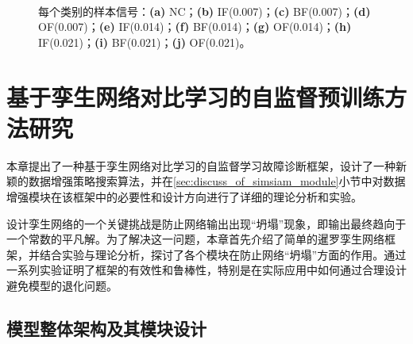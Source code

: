 \documentclass[master]{thesis-uestc}
\begin{document}
\begin{figure}
    \centering
    \\ %
    \\ %
    \\ %

    \caption{每个类别的样本信号：\textbf{(a)} NC；\textbf{(b)} IF(0.007)；\textbf{(c)} BF(0.007)；\textbf{(d)} OF(0.007)；\textbf{(e)} IF(0.014)；\textbf{(f)} BF(0.014)；\textbf{(g)} OF(0.014)；\textbf{(h)} IF(0.021)；\textbf{(i)} BF(0.021)；\textbf{(j)} OF(0.021)。}
    \label{cwru_samples}
\end{figure}



\chapter{基于孪生网络对比学习的自监督预训练方法研究}
本章提出了一种基于孪生网络对比学习的自监督学习故障诊断框架，设计了一种新颖的数据增强策略搜索算法，并在\ref{sec:discuss_of_simsiam_module}小节中对数据增强模块在该框架中的必要性和设计方向进行了详细的理论分析和实验。

设计孪生网络的一个关键挑战是防止网络输出出现“坍塌”现象，即输出最终趋向于一个常数的平凡解。为了解决这一问题，本章首先介绍了简单的暹罗孪生网络框架，并结合实验与理论分析，探讨了各个模块在防止网络“坍塌”方面的作用。通过一系列实验证明了框架的有效性和鲁棒性，特别是在实际应用中如何通过合理设计避免模型的退化问题。
\section{模型整体架构及其模块设计}
\end{document}
